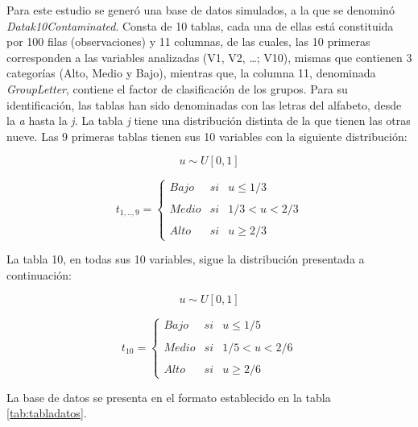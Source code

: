 \documentclass[mathematics,article,submit,moreauthors,pdftex]{mdpi}
\begin{document}
\label{simulados}

Para este estudio se generó una base de datos simulados, a la que se
denominó \emph{Datak10Contaminated}. Consta de 10 tablas, cada una de
ellas está constituida por 100 filas (observaciones) y 11 columnas, de
las cuales, las 10 primeras corresponden a las variables analizadas (V1,
V2, \ldots; V10), mismas que contienen 3 categorías (Alto, Medio y
Bajo), mientras que, la columna 11, denominada \emph{GroupLetter},
contiene el factor de clasificación de los grupos. Para su
identificación, las tablas han sido denominadas con las letras del
alfabeto, desde la \emph{a} hasta la \emph{j}. La tabla \emph{j} tiene
una distribución distinta de la que tienen las otras nueve. Las 9
primeras tablas tienen sus 10 variables con la siguiente distribución:

\[ u \sim U[0,1]\]

\[t_{1,..,9}= \left\{ \begin{array}{lcc}
             Bajo &   si  & u \leq 1/3 \\
             \\ Medio &  si & 1/3 < u < 2/3 \\
             \\ Alto &  si  & u \geq 2/3 
             \end{array}
   \right. \]

La tabla 10, en todas sus 10 variables, sigue la distribución presentada
a continuación:

\[ u \sim U[0,1]\]

\[t_{10}= \left\{ \begin{array}{lcc}
             Bajo &   si  & u \leq 1/5 \\
             \\ Medio &  si & 1/5 < u < 2/6 \\
             \\ Alto &  si  & u \geq 2/6 
             \end{array}
   \right. \]

La base de datos se presenta en el formato establecido en la tabla
\ref{tab:tabladatos}.
\end{document}
